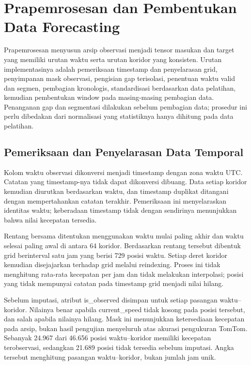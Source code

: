 \section{Prapemrosesan dan Pembentukan Data Forecasting}
\label{sec:b3-prapemrosesan}

Prapemrosesan menyusun arsip observasi menjadi tensor masukan dan target yang memiliki urutan waktu serta urutan koridor yang konsisten. Urutan implementasinya adalah pemeriksaan timestamp dan penyelarasan grid, penyimpanan mask observasi, pengisian gap terisolasi, penentuan waktu valid dan segmen, pembagian kronologis, standardisasi berdasarkan data pelatihan, kemudian pembentukan window pada masing-masing pembagian data. Penanganan gap dan segmentasi dilakukan sebelum pembagian data; prosedur ini perlu dibedakan dari normalisasi yang statistiknya hanya dihitung pada data pelatihan.

\subsection{Pemeriksaan dan Penyelarasan Data Temporal}
\label{subsec:b3-penyelarasan}

Kolom waktu observasi dikonversi menjadi timestamp dengan zona waktu UTC. Catatan yang timestamp-nya tidak dapat dikonversi dibuang. Data setiap koridor kemudian diurutkan berdasarkan waktu, dan timestamp duplikat ditangani dengan mempertahankan catatan terakhir. Pemeriksaan ini menyelaraskan identitas waktu; keberadaan timestamp tidak dengan sendirinya menunjukkan bahwa nilai kecepatan tersedia.

Rentang bersama ditentukan menggunakan waktu mulai paling akhir dan waktu selesai paling awal di antara 64 koridor. Berdasarkan rentang tersebut dibentuk grid berinterval satu jam yang berisi 729 posisi waktu. Setiap deret koridor kemudian disejajarkan terhadap grid melalui reindexing. Proses ini tidak menghitung rata-rata kecepatan per jam dan tidak melakukan interpolasi; posisi yang tidak mempunyai catatan pada timestamp grid menjadi nilai hilang.

Sebelum imputasi, atribut is\_observed disimpan untuk setiap pasangan waktu--koridor. Nilainya benar apabila current\_speed tidak kosong pada posisi tersebut, dan salah apabila nilainya hilang. Mask ini menunjukkan ketersediaan kecepatan pada arsip, bukan hasil pengujian menyeluruh atas akurasi pengukuran TomTom. Sebanyak 24.967 dari 46.656 posisi waktu--koridor memiliki kecepatan terobservasi, sedangkan 21.689 posisi tidak tersedia sebelum imputasi. Angka tersebut menghitung pasangan waktu--koridor, bukan jumlah jam unik.

